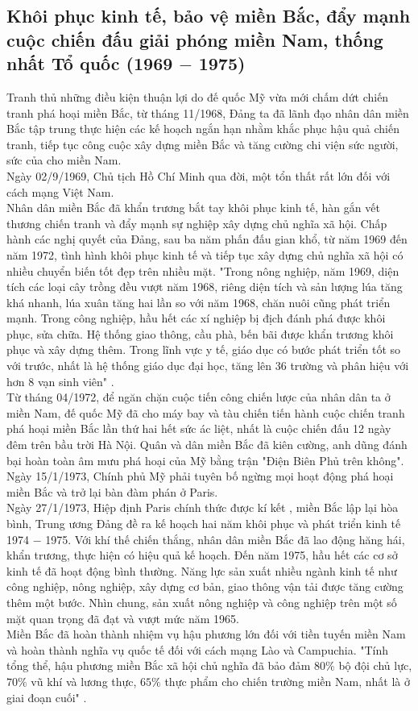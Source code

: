 \subsection{Khôi phục kinh tế, bảo vệ miền Bắc, đẩy mạnh cuộc chiến đấu giải phóng miền Nam, thống nhất Tổ quốc (1969 $-$ 1975)}
Tranh thủ những điều kiện thuận lợi do đế quốc Mỹ vừa mới chấm dứt chiến tranh phá hoại miền Bắc, từ tháng 11/1968, Đảng ta đã lãnh đạo nhân dân miền Bắc tập trung thực hiện các kế hoạch ngắn hạn nhằm khắc phục hậu quả chiến tranh, tiếp tục công cuộc xây dựng miền Bắc và tăng cường chi viện sức người, sức của cho miền Nam.\\
Ngày 02/9/1969, Chủ tịch Hồ Chí Minh qua đời, một tổn thất rất lớn đối với cách mạng Việt Nam.\\
Nhân dân miền Bắc đã khẩn trương bắt tay khôi phục kinh tế, hàn gắn vết thương chiến tranh và đẩy mạnh sự nghiệp xây dựng chủ nghĩa xã hội. Chấp hành các nghị quyết của Đảng, sau ba năm phấn đấu gian khổ, từ năm 1969 đến năm 1972, tình hình khôi phục kinh tế và tiếp tục xây dựng chủ nghĩa xã hội có nhiều chuyển biến tốt đẹp trên nhiều mặt. "Trong nông nghiệp, năm 1969, diện tích các loại cây trồng đều vượt năm 1968, riêng diện tích và sản lượng lúa tăng khá nhanh, lúa xuân tăng hai lần so với năm 1968, chăn nuôi cũng phát triển mạnh. Trong công nghiệp, hầu hết các xí nghiệp bị địch đánh phá được khôi phục, sửa chữa. Hệ thống giao thông, cầu phà, bến bãi được khẩn trương khôi phục và xây dựng thêm. Trong lĩnh vực y tế, giáo dục có bước phát triển tốt so với trước, nhất là hệ thống giáo dục đại học, tăng lên 36 trường và phân hiệu với hơn 8 vạn sinh viên" \supercite{giaotrinh}.\\
Từ tháng 04/1972, để ngăn chặn cuộc tiến công chiến lược của nhân dân ta ở miền Nam, đế quốc Mỹ đã cho máy bay và tàu chiến tiến hành cuộc chiến tranh phá hoại miền Bắc lần thứ hai hết sức ác liệt, nhất là cuộc chiến đấu 12 ngày đêm trên bầu trời Hà Nội. Quân và dân miền Bắc đã kiên cường, anh dũng đánh bại hoàn toàn âm mưu phá hoại của Mỹ bằng trận "Điện Biên Phủ trên không". Ngày 15/1/1973, Chính phủ Mỹ phải tuyên bố ngừng mọi hoạt động phá hoại miền Bắc và trở lại bàn đàm phán ở Paris.\\
Ngày 27/1/1973, Hiệp định Paris chính thức được kí kết \supercite{hdpr}, miền Bắc lập lại hòa bình, Trung ương Đảng đề ra kế hoạch hai năm khôi phục và phát triển kinh tế 1974 $-$ 1975. Với khí thế chiến thắng, nhân dân miền Bắc đã lao động hăng hái, khẩn trương, thực hiện có hiệu quả kế hoạch. Đến năm 1975, hầu hết các cơ sở kinh tế đã hoạt động bình thường. Năng lực sản xuất nhiều ngành kinh tế như công nghiệp, nông nghiệp, xây dựng cơ bản, giao thông vận tải được tăng cường thêm một bước. Nhìn chung, sản xuất nông nghiệp và công nghiệp trên một số mặt quan trọng đã đạt và vượt mức năm 1965.\\
Miền Bắc đã hoàn thành nhiệm vụ hậu phương lớn đối với tiền tuyến miền Nam và hoàn thành nghĩa vụ quốc tế đối với cách mạng Lào và Campuchia. "Tính tổng thể, hậu phương miền Bắc xã hội chủ nghĩa đã bảo đảm $80\%$ bộ đội chủ lực, $70\%$ vũ khí và lương thực, $65\%$ thực phẩm cho chiến trường miền Nam, nhất là ở giai đoạn cuối" \supercite{giaotrinh}.